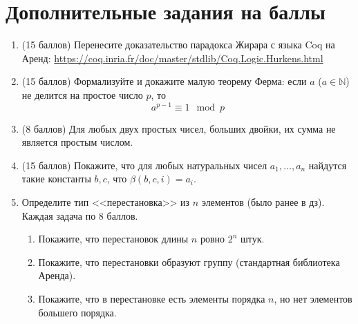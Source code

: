 \documentclass[10pt,a4paper,oneside]{article}
\begin{document}
\section*{Дополнительные задания на баллы}
\begin{enumerate}
\item (15 баллов) Перенесите доказательство парадокса Жирара с языка Coq на Аренд:
\url{https://coq.inria.fr/doc/master/stdlib/Coq.Logic.Hurkens.html}

\item (15 баллов) 
Формализуйте и докажите малую теорему Ферма: если $a$ ($a \in \mathbb{N}$) не делится на простое число $p$,
то $$a^{p-1} \equiv 1 \mod p$$ 

\item (8 баллов) Для любых двух простых чисел, больших двойки, их сумма не является простым числом.

\item (15 баллов) Покажите, что для любых натуральных чисел $a_1,\dots,a_n$ найдутся такие константы $b,c$, что $\beta(b,c,i) = a_i$.

\item Определите тип <<перестановка>> из $n$ элементов (было ранее в дз). Каждая задача по 8 баллов.
\begin{enumerate}
\item Покажите, что перестановок длины $n$ ровно $2^n$ штук.
\item Покажите, что перестановки образуют группу (стандартная библиотека Аренда).
\item Покажите, что в перестановке есть элементы порядка $n$, но нет элементов большего порядка.
\end{enumerate}

\end{enumerate}
\end{document}
